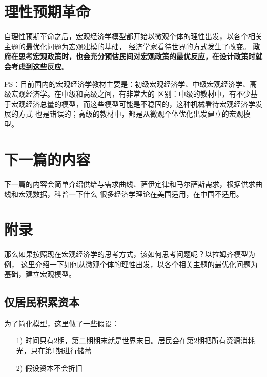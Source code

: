 \documentclass[UTF8]{article}
\begin{document}
\section{理性预期革命}
    自理性预期革命之后，宏观经济学模型都开始以微观个体的理性出发，以各个相关主题的最优化问题为宏观建模的基础，
    经济学家看待世界的方式发生了改变。
    \textbf{政府在思考宏观政策时，也会充分预估民间对宏观政策的最优反应，在设计政策时就会考虑到这些反应}。\par
    PS：目前国内的宏观经济学教材主要是：初级宏观经济学、中级宏观经济学、高级宏观经济学。在中级和高级之间，有非常大的
    区别：中级的教材中，有不少基于宏观经济总量的模型，而这些模型可能是不稳固的，这种机械看待宏观经济学发展的方式
    也是错误的；高级的教材中，都是从微观个体优化出发建立的宏观模型。

\section{下一篇的内容}
    下一篇的内容会简单介绍供给与需求曲线、萨伊定律和马尔萨斯需求，根据供求曲线和宏观数据，科普一下什么
    很多经济学理论在美国适用，在中国不适用。

\section{附录}
    那么如果按照现在宏观经济学的思考方式，该如何思考问题呢？以拉姆齐模型为例，
    这里介绍一下如何从微观个体的理性出发，以各个相关主题的最优化问题为基础，建立宏观模型。
    \subsection{仅居民积累资本}
        为了简化模型，这里做了一些假设：
        \begin{itemize}
            \item [1)]
                时间只有2期，第二期期末就是世界末日。居民会在第2期把所有资源消耗光，只在第1期进行储蓄
            \item [2)]
                假设资本不会折旧
        \end{itemize}
        
\end{document}
